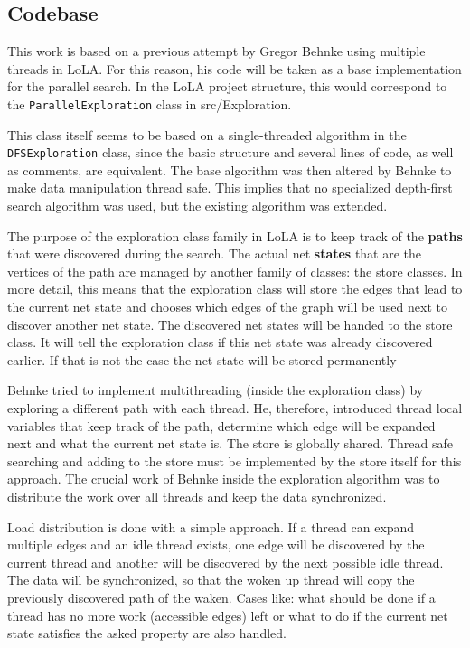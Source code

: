\subsection{Codebase}
\label{codeBase}
This work is based on a previous attempt by Gregor Behnke using multiple threads in LoLA. For this reason, his code will be taken as a base implementation for the parallel search. In the LoLA project structure, this would correspond to the \texttt{ParallelExploration} class in src/Exploration.

This class itself seems to be based on a single-threaded algorithm in the \texttt{DFSExploration} class, since the basic structure and several lines of code, as well as comments, are equivalent. The base algorithm was then altered by Behnke to make data manipulation thread safe. This implies that no specialized depth-first search algorithm was used, but the existing algorithm was extended.

The purpose of the exploration class family in LoLA is to keep track of the \textbf{paths} that were discovered during the search. The actual net \textbf{states} that are the vertices of the path are managed by another family of classes: the store classes. In more detail, this means that the exploration class will store the edges that lead to the current net state and chooses which edges of the graph will be used next to discover another net state. The discovered net states will be handed to the store class. It will tell the exploration class if this net state was already discovered earlier. If that is not the case the net state will be stored permanently

Behnke tried to implement multithreading (inside the exploration class) by exploring a different path with each thread. He, therefore, introduced thread local variables that keep track of the path, determine which edge will be expanded next and what the current net state is. The store is globally shared. Thread safe searching and adding to the store must be implemented by the store itself for this approach. The crucial work of Behnke inside the exploration algorithm was to distribute the work over all threads and keep the data synchronized.

Load distribution is done with a simple approach. If a thread can expand multiple edges and an idle thread exists, one edge will be discovered by the current thread and another will be discovered by the next possible idle thread. The data will be synchronized, so that the woken up thread will copy the previously discovered path of the waken. Cases like: what should be done if a thread has no more work (accessible edges) left or what to do if the current net state satisfies the asked property are also handled.

